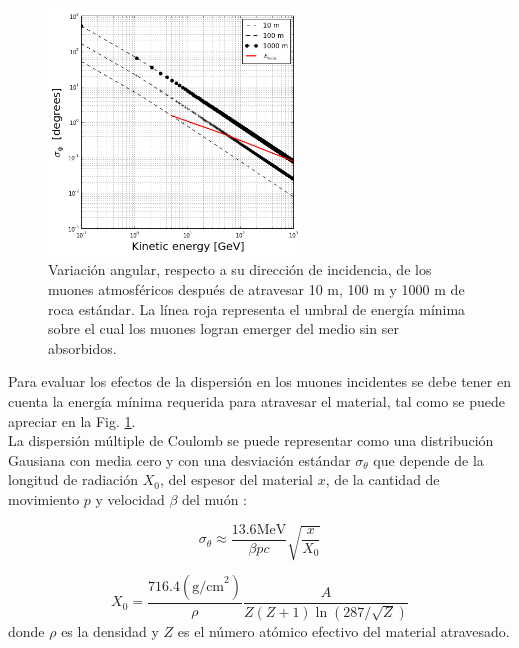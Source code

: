 \begin{figure}[h!]
\begin{center}
\includegraphics[width=0.6\textwidth]{Figures/Scattering}
\caption[Variación angular, respecto a su dirección de incidencia, de los muones atmosféricos después de atravesar 10 m, 100 m y 1000 m de roca estándar]{Variación angular, respecto a su dirección de incidencia, de los muones atmosféricos después de atravesar 10 m, 100 m y 1000 m de roca estándar. La línea roja representa el umbral de energía mínima sobre el cual los muones logran emerger del medio sin ser absorbidos.}
\label{Scattering_Variance}
\end{center}
\end{figure}

Para evaluar los efectos de la dispersión en los muones incidentes se debe tener en cuenta la energía mínima requerida para atravesar el material, tal como se puede apreciar en la  Fig. \ref{Scattering_Variance}.\\

La dispersión múltiple de Coulomb se puede representar como una distribución Gausiana con media cero y con una desviación estándar $\sigma_\theta$ que depende de la longitud de radiación $X_0$, del espesor del material $x$, de la cantidad de movimiento $p$ y velocidad $\beta$ del muón  \cite{Grupen2008}:

\begin{equation}
\sigma_\theta \approx \frac{13.6 \text{MeV}}{\beta p c} \sqrt{\frac{x}{X_0}}
\end{equation}

\begin{equation}
X_0 = \frac{716.4 (\text{g/cm}^2)}{\rho} \frac{A}{Z(Z+1)\ln (287/\sqrt{Z})}
\end{equation}
donde $\rho$ es la densidad y $Z$ es el número atómico efectivo del material atravesado.


